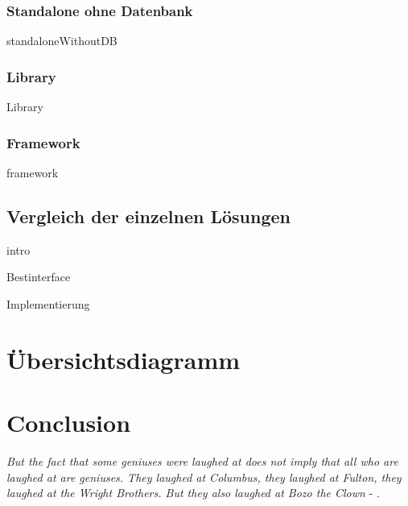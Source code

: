 \documentclass{article}
\begin{document}
        \newpage
        \subsubsection{Standalone ohne Datenbank}
            {standaloneWithoutDB}

        \newpage
        \subsubsection{Library}
            {Library}
        
        \newpage
        \subsubsection{Framework}
            {framework}
    
    \newpage
    \subsection{Vergleich der einzelnen Lösungen}
        {intro}

\newpage
{Bestinterface}

\newpage
{Implementierung}

\section{Übersichtsdiagramm}

\section{Conclusion}
\textit{But the fact that some geniuses were laughed at does not imply that all who are laughed at are geniuses. They laughed at Columbus, they laughed at Fulton, they laughed at the Wright Brothers. But they also laughed at Bozo the Clown} -  \textcite{sagan_1993}.

\newpage
\printbibliography[heading = bibintoc, title = Bibliography]    %

\end{document}
